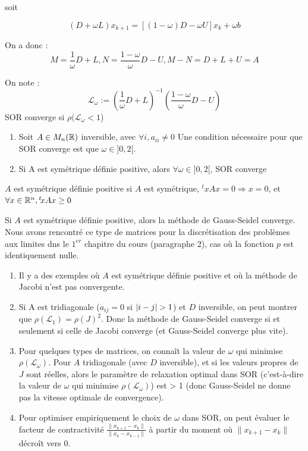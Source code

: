soit

\[
    (D + \omega L)x_{k+1} = [(1-\omega)D - \omega U]x_k + \omega b
\]

On a donc : 
\[
    M = \frac{1}{\omega}D + L, N = \frac{1-\omega}{\omega}D - U, M-N=D+L+U=A
\]

On note :
\[
    \mathcal{L}_{\omega} := (\frac{1}{\omega}D + L)^{-1}(\frac{1-\omega}{\omega}D - U)
\]
SOR converge si $\rho(\mathcal{L}_{\omega}<1$)

\begin{ftheo}[demo en TD]
    \begin{enumerate}
        \item
            Soit $A \in M_n(\mathbb{R})$ inversible, avec $\forall i, a_{ii} \ne 0$
            Une condition nécessaire pour que SOR converge est que $\omega \in ]0,2[$.

        \item
            Si A est symétrique définie positive, alors $\forall \omega \in ]0,2[$, SOR converge 
    \end{enumerate}
\end{ftheo}

\begin{rappel}
    $A$ est symétrique définie positive si $A$ est symétrique, $^txAx = 0 \Rightarrow x = 0$, et $\forall x \in \mathbb{R}^n, {}^t\!xAx \geq 0$
\end{rappel}

\begin{coroll}
    Si $A$ est symétrique définie positive, alors la méthode de Gauss-Seidel converge.
    Nous avons rencontré ce type de matrices pour la discrétisation des problèmes aux limites dns le $1^{er}$ chapitre du cours (paragraphe 2), cas où la fonction $p$ est identiquement nulle.
\end{coroll}

\begin{remark}
    \begin{enumerate}
        \item Il y a des exemples où $A$ est symétrique définie positive et où la méthode de Jacobi n'est pas convergente.
        \item Si A est tridiagonale ($a_{ij}=0$ si $\left\lvert i-j\right\rvert>1$) et $D$ inversible, on peut montrer que $\rho(\mathcal{L}_1)=\rho(J)^2$. Donc la méthode de Gauss-Seidel converge si et seulement si celle de Jacobi converge (et Gauss-Seidel converge plus vite).
        \item  Pour quelques types de matrices, on connaît la valeur de $\omega$ qui minimise $\rho (\mathcal{L}_{\omega})$.
            Pour $A$ tridiagonale (avec $D$ inversible), et si les valeurs propres de $J$ sont réelles, alors le paramètre de relaxation optimal dans SOR (c'est-à-dire la valeur de $\omega$ qui minimise $\rho (\mathcal{L}_{\omega})$) est > 1 (donc Gauss-Seidel ne donne pas la vitesse optimale de convergence).
        \item Pour optimiser empiriquement le choix de $\omega$ dans SOR, on peut évaluer le facteur de contractivité $\frac{\| x_{k+1} - x_k\|}{\| x_k - x_{k-1}\|}$ à partir du moment où $\|x_{k+1}-x_{k}\|$ décroît vers 0.
    \end{enumerate}
\end{remark}

